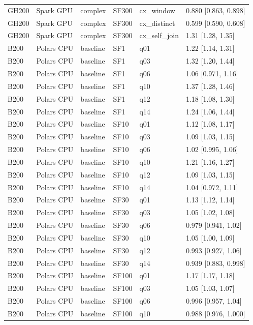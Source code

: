 \begin{longtable}{llllll}
GH200 & Spark GPU & complex & SF300 & cx\_window & 0.880 [0.863, 0.898] \\
GH200 & Spark GPU & complex & SF300 & cx\_distinct & 0.599 [0.590, 0.608] \\
GH200 & Spark GPU & complex & SF300 & cx\_self\_join & 1.31 [1.28, 1.35] \\
B200 & Polars CPU & baseline & SF1 & q01 & 1.22 [1.14, 1.31] \\
B200 & Polars CPU & baseline & SF1 & q03 & 1.32 [1.20, 1.44] \\
B200 & Polars CPU & baseline & SF1 & q06 & 1.06 [0.971, 1.16] \\
B200 & Polars CPU & baseline & SF1 & q10 & 1.37 [1.28, 1.46] \\
B200 & Polars CPU & baseline & SF1 & q12 & 1.18 [1.08, 1.30] \\
B200 & Polars CPU & baseline & SF1 & q14 & 1.24 [1.06, 1.44] \\
B200 & Polars CPU & baseline & SF10 & q01 & 1.12 [1.08, 1.17] \\
B200 & Polars CPU & baseline & SF10 & q03 & 1.09 [1.03, 1.15] \\
B200 & Polars CPU & baseline & SF10 & q06 & 1.02 [0.995, 1.06] \\
B200 & Polars CPU & baseline & SF10 & q10 & 1.21 [1.16, 1.27] \\
B200 & Polars CPU & baseline & SF10 & q12 & 1.09 [1.03, 1.15] \\
B200 & Polars CPU & baseline & SF10 & q14 & 1.04 [0.972, 1.11] \\
B200 & Polars CPU & baseline & SF30 & q01 & 1.13 [1.12, 1.14] \\
B200 & Polars CPU & baseline & SF30 & q03 & 1.05 [1.02, 1.08] \\
B200 & Polars CPU & baseline & SF30 & q06 & 0.979 [0.941, 1.02] \\
B200 & Polars CPU & baseline & SF30 & q10 & 1.05 [1.00, 1.09] \\
B200 & Polars CPU & baseline & SF30 & q12 & 0.993 [0.927, 1.06] \\
B200 & Polars CPU & baseline & SF30 & q14 & 0.939 [0.883, 0.998] \\
B200 & Polars CPU & baseline & SF100 & q01 & 1.17 [1.17, 1.18] \\
B200 & Polars CPU & baseline & SF100 & q03 & 1.05 [1.03, 1.07] \\
B200 & Polars CPU & baseline & SF100 & q06 & 0.996 [0.957, 1.04] \\
B200 & Polars CPU & baseline & SF100 & q10 & 0.988 [0.976, 1.000] \\

\end{longtable}
